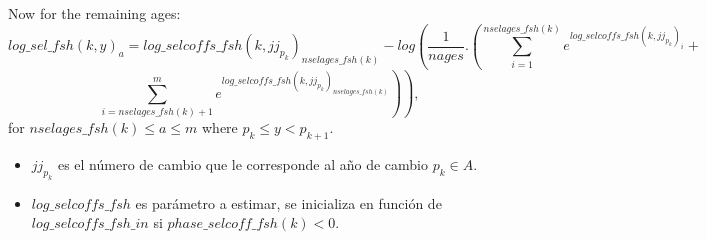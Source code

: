 \documentclass{article}
\begin{document}
\begin{itemize}
  Now for the remaining ages:
    \begin{equation}
         log\_sel\_fsh(k,y)_a=log\_selcoffs\_fsh(k,jj_{p_k})_{nselages\_fsh(k)}-log\left(\dfrac{1}{nages}.\left(\sum_{i=1}^{nselages\_fsh(k)}e^{log\_selcoffs\_fsh(k,jj_{p_k})_i}+\right.\right.
    \end{equation}
 \begin{equation*}
       \left. \left.\sum_{i=nselages\_fsh(k)+1}^{m}e^{log\_selcoffs\_fsh(k,jj_{p_k})_{nselages\_fsh(k)}}\right)\right), 
    \end{equation*}
    for $nselages\_fsh(k)\leq a \leq m$ where $p_k\leq y < p_{k+1}$.
    \begin{itemize}
        \item $jj_{p_k}$ es el número de cambio que le corresponde al año de cambio $p_k\in A$.
        \item $log\_selcoffs\_fsh$ es parámetro a estimar, se inicializa en función de $log\_selcoffs\_fsh\_in$ si $phase\_selcoff\_fsh(k)<0$.
    \end{itemize}














    
   
    

\end{itemize}
\end{document}
